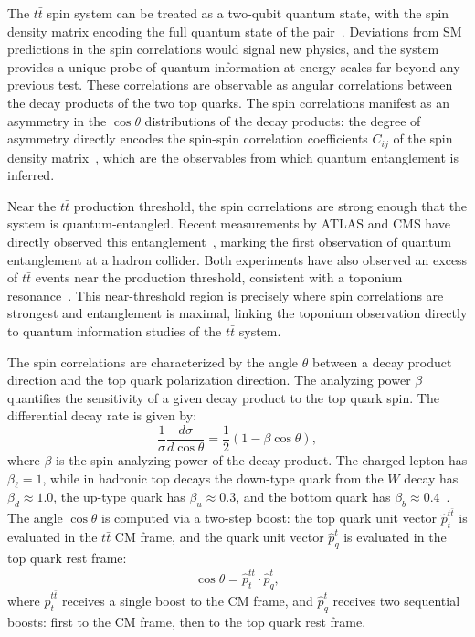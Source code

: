 The $t\bar{t}$ spin system can be treated as a two-qubit quantum state, with the spin density matrix encoding the full quantum state of the pair~\cite{Afik_2021,Afik_2022}.
Deviations from SM predictions in the spin correlations would signal new physics, and the system provides a unique probe of quantum information at energy scales far beyond any previous test. 
These correlations are observable as angular correlations between the decay products of the two top quarks.
The spin correlations manifest as an asymmetry in the $\cos\theta$ distributions of the decay products: the degree of asymmetry directly encodes the spin-spin correlation coefficients $C_{ij}$ of the spin density matrix~\cite{Afik_2021,Afik_2022}, which are the observables from which quantum entanglement is inferred.

Near the $t\bar{t}$ production threshold, the spin correlations are strong enough that the system is quantum-entangled. 
Recent measurements by ATLAS and CMS have directly observed this entanglement~\cite{ATLAS_entanglement,CMS_entanglement}, marking the first observation of quantum entanglement at a hadron collider.
Both experiments have also observed an excess of $t\bar{t}$ events near the production threshold, consistent with a toponium resonance~\cite{CMS_toponium,ATLAS_toponium}.
This near-threshold region is precisely where spin correlations are strongest and entanglement is maximal, linking the toponium observation directly to quantum information studies of the $t\bar{t}$ system.

The spin correlations are characterized by the angle $\theta$ between a decay product direction and the top quark polarization direction. 
The analyzing power $\beta$ quantifies the sensitivity of a given decay product to the top quark spin. 
The differential decay rate is given by:
\begin{equation}
    \frac{1}{\sigma}\frac{d\sigma}{d\cos\theta} = \frac{1}{2}(1 - \beta\cos\theta),
    \label{eq:decay_rate}
\end{equation}
where $\beta$ is the spin analyzing power of the decay product.
The charged lepton has $\beta_\ell = 1$, while in hadronic top decays the down-type quark from the $W$ decay has $\beta_d \approx 1.0$, the up-type quark has $\beta_u \approx 0.3$, and the bottom quark has $\beta_b \approx 0.4$~\cite{PDG2022}.
The angle $\cos\theta$ is computed via a two-step boost: the top quark unit vector $\hat{p}_{t}^{t\bar{t}}$ is evaluated in the $t\bar{t}$ CM frame, and the quark unit vector $\hat{p}_{q}^{t}$ is evaluated in the top quark rest frame:
\begin{equation}
	\cos\theta = \hat{p}_{t}^{t\bar{t}} \cdot \hat{p}_{q}^{t},
	\label{eq:costheta}
\end{equation}
where $\hat{p}_{t}^{t\bar{t}}$ receives a single boost to the CM frame, and $\hat{p}_{q}^{t}$ receives two sequential boosts: first to the CM frame, then to the top quark rest frame.

